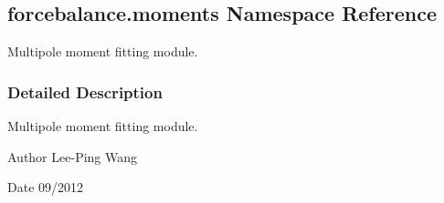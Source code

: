 \hypertarget{namespaceforcebalance_1_1moments}{}\subsection{forcebalance.\+moments Namespace Reference}
\label{namespaceforcebalance_1_1moments}


Multipole moment fitting module.  




\subsubsection{Detailed Description}
Multipole moment fitting module. 

\begin{DoxyAuthor}{Author}
Lee-\/\+Ping Wang 
\end{DoxyAuthor}
\begin{DoxyDate}{Date}
09/2012 
\end{DoxyDate}
